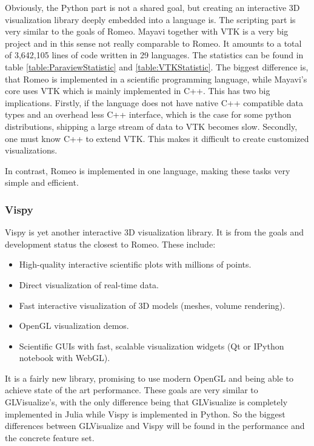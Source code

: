 Obviously, the Python part is not a shared goal, but creating an interactive 3D visualization library deeply embedded into a language is. The scripting part is very similar to the goals of Romeo.
Mayavi together with VTK is a very big project and in this sense not really comparable to Romeo.
It amounts to a total of 3,642,105 lines of code written in 29 languages. The statistics can be found in table \ref{table:ParaviewStatistic} and \ref{table:VTKStatistic}.
The biggest difference is, that Romeo is implemented in a scientific programming language, while Mayavi's core uses VTK which is mainly implemented in C++.
This has two big implications.
Firstly, if the language does not have native C++ compatible data types and an overhead less C++ interface, which is the case for some python distributions, shipping a large stream of data to VTK becomes slow.
Secondly, one must know C++ to extend VTK. This makes it difficult to create customized visualizations.

In contrast, Romeo is implemented in one language, making these tasks very simple and efficient.


\subsubsection{Vispy}

Vispy is yet another interactive 3D visualization library. It is from the goals and development status the closest to Romeo.
These include\cite{VispyGoals}:

\begin{itemize}
    \item High-quality interactive scientific plots with millions of points.
    \item Direct visualization of real-time data.
    \item Fast interactive visualization of 3D models (meshes, volume rendering).
    \item OpenGL visualization demos.
    \item Scientific GUIs with fast, scalable visualization widgets (Qt or IPython notebook with \ac{WebGL}).
\end{itemize}

It is a fairly new library, promising to use modern OpenGL and being able to achieve state of the art performance.
These goals are very similar to GLVisualize's, with the only difference being that GLVisualize is completely implemented in Julia while Vispy is implemented in Python.
So the biggest differences between GLVisualize and Vispy will be found in the performance and the concrete feature set.
